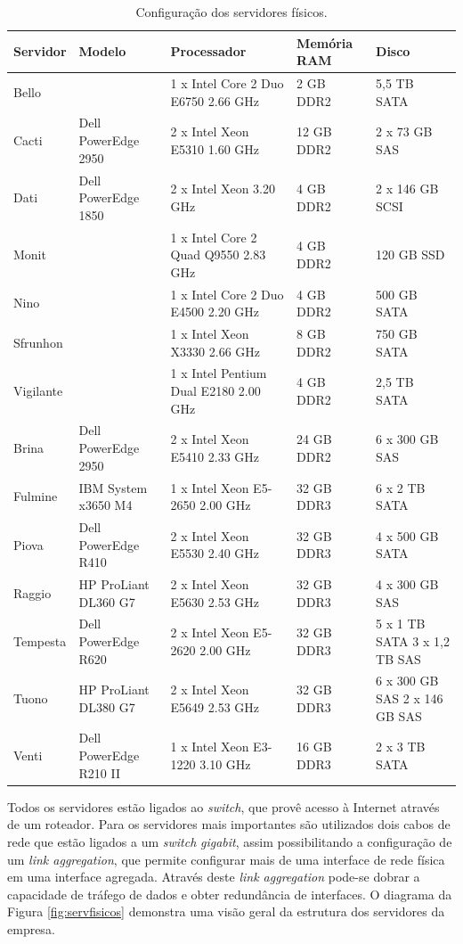 \begin{table}[h!]
\caption{Configuração dos servidores físicos.}
\label{tab:servfisicos}
\begin{center}
\def\arraystretch{1}
\setlength{\tabcolsep}{0.15cm}
\begin{tabular}{|l|l|p{5.1cm}|l|p{2.1cm}|}\hline
\textbf{Servidor} & \textbf{Modelo} & \textbf{Processador} & \textbf{Memória \ac{RAM}} & \textbf{Disco} \\\hline
Bello & & 1 x Intel Core 2 Duo E6750 2.66 GHz & 2 GB DDR2 & 5,5 TB SATA\\\hline
Cacti & Dell PowerEdge 2950 & 2 x Intel Xeon E5310 1.60 GHz & 12 GB DDR2 & 2 x 73 GB SAS\\\hline
Dati & Dell PowerEdge 1850 & 2 x Intel Xeon 3.20 GHz & 4 GB DDR2 & 2 x 146 GB SCSI\\\hline
Monit & & 1 x Intel Core 2 Quad Q9550 2.83 GHz & 4 GB DDR2 & 120 GB SSD\\\hline
Nino & & 1 x Intel Core 2 Duo E4500 2.20 GHz & 4 GB DDR2 & 500 GB SATA\\\hline
Sfrunhon & & 1 x Intel Xeon X3330 2.66 GHz & 8 GB DDR2 & 750 GB SATA\\\hline
Vigilante & & 1 x Intel Pentium Dual E2180 2.00 GHz & 4 GB DDR2 & 2,5 TB SATA\\\hline
Brina & Dell PowerEdge 2950 & 2 x Intel Xeon E5410 2.33 GHz & 24 GB DDR2 & 6 x 300 GB SAS\\\hline
Fulmine & IBM System x3650 M4 & 1 x Intel Xeon E5-2650 2.00 GHz & 32 GB DDR3 & 6 x 2 TB SATA\\\hline
Piova & Dell PowerEdge R410 & 2 x Intel Xeon E5530 2.40 GHz & 32 GB DDR3 & 4 x 500 GB SATA\\\hline
Raggio & HP ProLiant DL360 G7 & 2 x  Intel Xeon E5630 2.53 GHz & 32 GB DDR3 & 4 x 300 GB SAS\\\hline
Tempesta & Dell PowerEdge R620 & 2 x Intel Xeon E5-2620 2.00 GHz & 32 GB DDR3 & 5 x 1 TB SATA 3 x 1,2 TB SAS\\\hline
Tuono & HP ProLiant DL380 G7 & 2 x Intel Xeon E5649 2.53 GHz & 32 GB DDR3 & 6 x 300 GB SAS 2 x 146 GB SAS\\\hline
Venti & Dell PowerEdge R210 II & 1 x Intel Xeon E3-1220 3.10 GHz & 16 GB DDR3 & 2 x 3 TB SATA\\\hline
\end{tabular}
\end{center}
\end{table}

Todos os servidores estão ligados ao \textit{switch}, que provê acesso à Internet através de um roteador. Para os servidores mais importantes 
são utilizados dois cabos de rede que estão ligados a um \textit{switch} \textit{gigabit}, assim possibilitando a configuração de um 
\textit{link aggregation}, que permite configurar mais de uma interface de rede física em uma interface agregada. Através deste 
\textit{link aggregation} pode-se dobrar a capacidade de tráfego de dados e obter redundância de interfaces. 
O diagrama da Figura \ref{fig:servfisicos} demonstra uma visão geral da estrutura dos servidores da empresa. 

